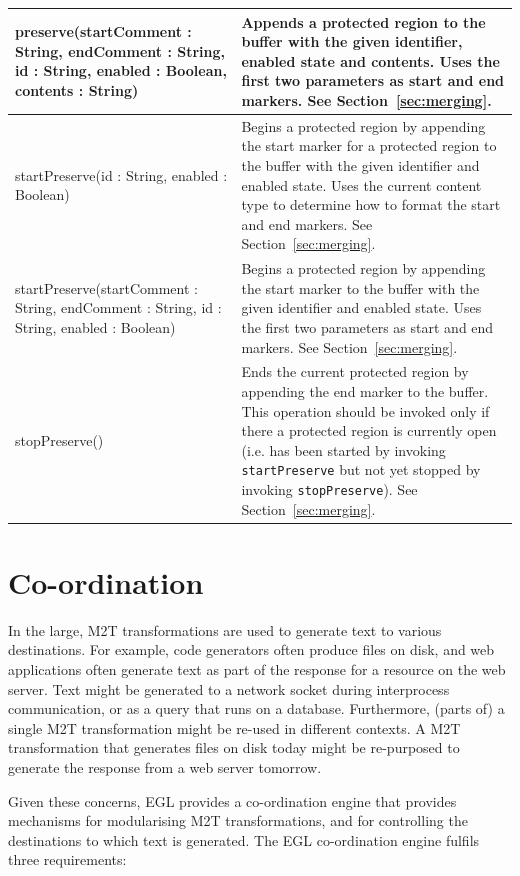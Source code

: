 \begin{longtabu} {|p{6.5cm}|X|}
			preserve(startComment : String, endComment : String, id : String, enabled : Boolean, contents : String) & Appends a protected region to the buffer with the given identifier, enabled state and contents. Uses the first two parameters as start and end markers. See Section~\ref{sec:merging}. \\\hline
			
			startPreserve(id : String, enabled : Boolean) & Begins a protected region by appending the start marker for a protected region to the buffer with the given identifier and enabled state. Uses the current content type to determine how to format the start and end markers. See Section~\ref{sec:merging}. \\\hline
			
			startPreserve(startComment : String, endComment : String, id : String, enabled : Boolean) & Begins a protected region by appending the start marker to the buffer with the given identifier and enabled state. Uses the first two parameters as start and end markers. See Section~\ref{sec:merging}. \\\hline
			
			stopPreserve() & Ends the current protected region by appending the end marker to the buffer. This operation should be invoked only if there a protected region is currently open (i.e. has been started by invoking \texttt{st\-a\-rtPr\-es\-er\-ve} but not yet stopped by invoking \texttt{st\-opPr\-es\-er\-ve}). See Section~\ref{sec:merging}. \\\hline
\end{longtabu}

\section{Co-ordination}
\label{Co-ordination}
In the large, M2T transformations are used to generate text to various destinations. For example, code generators often produce files on disk, and web applications often generate text as part of the response for a resource on the web server. Text might be generated to a network socket during interprocess communication, or as a query that runs on a database. Furthermore, (parts of) a single M2T transformation might be re-used in different contexts. A M2T transformation that generates files on disk today might be re-purposed to generate the response from a web server tomorrow.  

Given these concerns, EGL provides a co-ordination engine that provides mechanisms for modularising M2T transformations, and for controlling the destinations to which text is generated. The EGL co-ordination engine fulfils three requirements:

